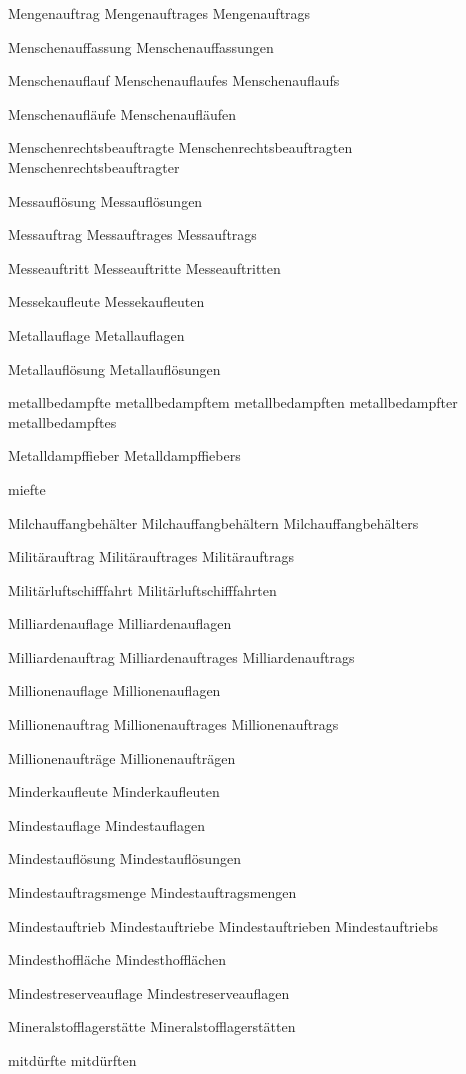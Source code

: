 Mengenauftrag
Mengenauftrages
Mengenauftrags

Menschenauffassung
Menschenauffassungen

Menschenauflauf
Menschenauflaufes
Menschenauflaufs

Menschenaufläufe
Menschenaufläufen

Menschenrechtsbeauftragte
Menschenrechtsbeauftragten
Menschenrechtsbeauftragter

Messauflösung
Messauflösungen

Messauftrag
Messauftrages
Messauftrags

Messeauftritt
Messeauftritte
Messeauftritten

Messekaufleute
Messekaufleuten

Metallauflage
Metallauflagen

Metallauflösung
Metallauflösungen

metallbedampfte
metallbedampftem
metallbedampften
metallbedampfter
metallbedampftes

Metalldampffieber
Metalldampffiebers

miefte

Milchauffangbehälter
Milchauffangbehältern
Milchauffangbehälters

Militärauftrag
Militärauftrages
Militärauftrags

Militärluftschifffahrt
Militärluftschifffahrten

Milliardenauflage
Milliardenauflagen

Milliardenauftrag
Milliardenauftrages
Milliardenauftrags

Millionenauflage
Millionenauflagen

Millionenauftrag
Millionenauftrages
Millionenauftrags

Millionenaufträge
Millionenaufträgen

Minderkaufleute
Minderkaufleuten

Mindestauflage
Mindestauflagen

Mindestauflösung
Mindestauflösungen

Mindestauftragsmenge
Mindestauftragsmengen

Mindestauftrieb
Mindestauftriebe
Mindestauftrieben
Mindestauftriebs

Mindesthoffläche
Mindesthofflächen

Mindestreserveauflage
Mindestreserveauflagen

Mineralstofflagerstätte
Mineralstofflagerstätten

mitdürfte
mitdürften

